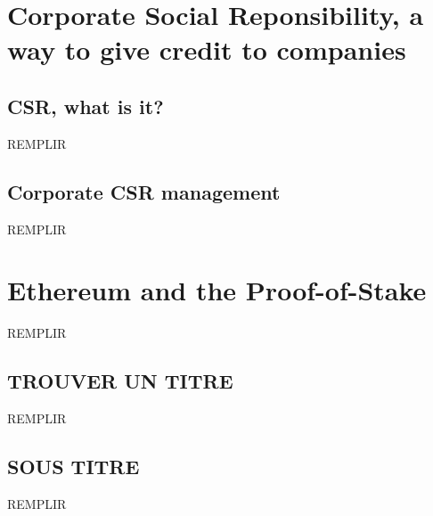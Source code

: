 \documentclass{ifacconf}
\begin{document}
\section{Corporate Social Reponsibility, a way to give credit to companies}


\subsection{CSR, what is it?}

REMPLIR

\subsection{Corporate CSR management}

REMPLIR

\section{Ethereum and the Proof-of-Stake}

REMPLIR

\subsection{TROUVER UN TITRE}
REMPLIR
\subsection{SOUS TITRE}

REMPLIR





\end{document}

